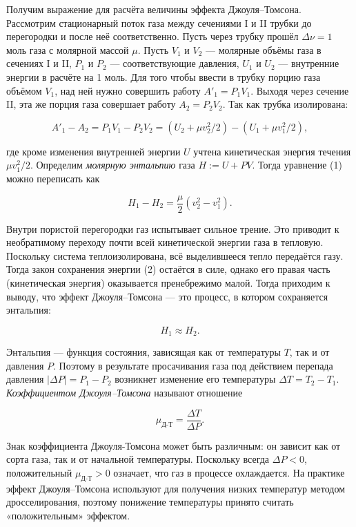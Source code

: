 \documentclass{article}
\begin{document}
Получим выражение для расчёта величины эффекта Джоуля–Томсона. Рассмотрим стационарный поток газа между сечениями I и II трубки до перегородки и после неё соответственно. Пусть через трубку прошёл $\Delta \nu = 1$ моль газа с молярной массой $\mu$. Пусть $V_1$ и $V_2$ — молярные объёмы газа в сечениях I и II, $P_1$ и $P_2$ — соответствующие давления, $U_1$ и $U_2$ — внутренние энергии в расчёте на 1 моль. Для того чтобы ввести в трубку порцию газа объёмом $V_1$, над ней нужно совершить работу $A'_1 = P_1 V_1$. Выходя через сечение II, эта же порция газа совершает работу $A_2 = P_2 V_2$. Так как трубка изолирована:

\begin{equation}
	A'_1 - A_2 = P_1 V_1 - P_2 V_2 = (U_2 + \mu v_2^2/2) - (U_1 + \mu v_1^2/2), 
\end{equation}

где кроме изменения внутренней энергии $U$ учтена кинетическая энергия течения $\mu v_1^2/2$. Определим \textit{молярную энтальпию} газа $H := U + PV$. Тогда уравнение (1) можно переписать как

\begin{equation}
H_1 - H_2 = \frac{\mu}{2}(v_2^2 - v_1^2). 
\end{equation}

Внутри пористой перегородки газ испытывает сильное трение. Это приводит к необратимому переходу почти всей кинетической энергии газа в тепловую. Поскольку система теплоизолирована, всё выделившееся тепло передаётся газу. Тогда закон сохранения энергии (2) остаётся в силе, однако его правая часть (кинетическая энергия) оказывается пренебрежимо малой. Тогда приходим к выводу, что эффект Джоуля–Томсона — это процесс, в котором сохраняется энтальпия:

\begin{equation}
H_1 \approx H_2.
\end{equation}

Энтальпия — функция состояния, зависящая как от температуры $T$, так и от давления $P$. Поэтому в результате просачивания газа под действием перепада давления $|\Delta P| = P_1 - P_2$ возникнет изменение его температуры $\Delta T = T_2 - T_1$. \textit{Коэффициентом Джоуля–Томсона} называют отношение

\begin{equation}
\mu_{\text{Д-Т}} = \frac{\Delta T}{\Delta P}. 
\end{equation}

Знак коэффициента Джоуля-Томсона может быть различным: он зависит как от сорта газа, так и от начальной температуры. Поскольку всегда $\Delta P < 0$, положительный $\mu_{\text{Д-Т}} > 0$ означает, что газ в процессе охлаждается. На практике эффект Джоуля–Томсона используют для получения низких температур методом дросселирования, поэтому понижение температуры принято считать «положительным» эффектом.
\end{document}
